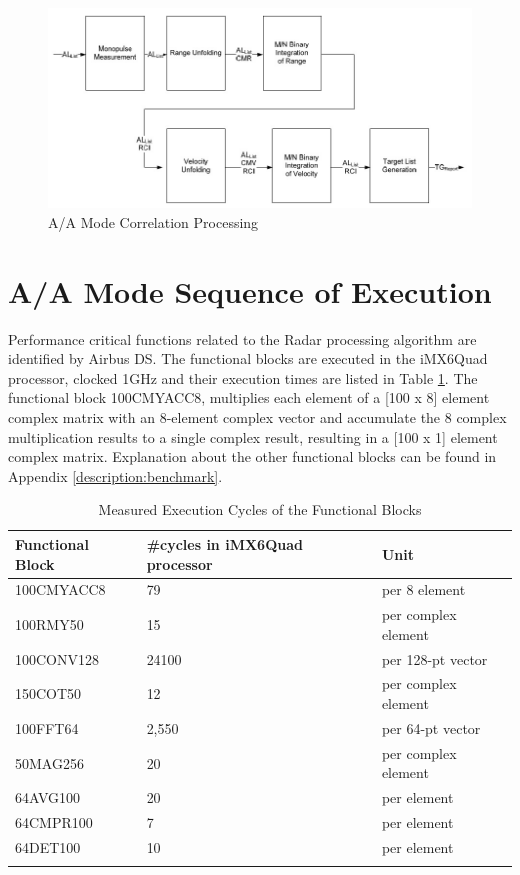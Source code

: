 \begin{figure}[h!]
	\centering
	\includegraphics[width=140mm]{figures/aa_corr}
	\caption{A/A Mode Correlation Processing}
	\label{fig:bg_related_work:aa_corr}
\end{figure}
\FloatBarrier

\section{A/A Mode Sequence of Execution}
\label{sec:ch2:benchmark_results}
Performance critical functions related to the Radar processing algorithm are identified by Airbus DS. The functional blocks are executed in the iMX6Quad processor, clocked 1GHz and their execution times are listed in Table \ref{tbl:aa_exe}. The functional block 100CMYACC8, multiplies each element of a [100 x 8] element complex matrix with an 8-element complex vector and accumulate the 8 complex multiplication results to a single complex result, resulting in a [100 x 1] element complex matrix. Explanation about the other functional blocks can be found in Appendix \ref{description:benchmark}.

\begin{longtable}{|l|l|l|}
		\hline
		\textbf{Functional Block} & \textbf{\#cycles in iMX6Quad processor} & \textbf{Unit}  \TBstrut \\ \hline
		100CMYACC8 & 79 & per 8 element \TBstrut \\ \hline
		100RMY50 & 15 & per complex element \TBstrut \\ \hline
		100CONV128 & 24100 & per 128-pt vector \TBstrut \\ \hline
		150COT50 & 12 & per complex element \TBstrut \\ \hline
		100FFT64 & 2,550 & per 64-pt vector \TBstrut \\ \hline
		50MAG256 & 20 & per complex element \TBstrut \\ \hline
		64AVG100 & 20 & per element \TBstrut \\ \hline
		64CMPR100 & 7 & per element \TBstrut \\ \hline
		64DET100 & 10 & per element  \TBstrut \\ \hline
		\caption{Measured Execution Cycles of the Functional Blocks}
		\label{tbl:aa_exe}
\end{longtable}

